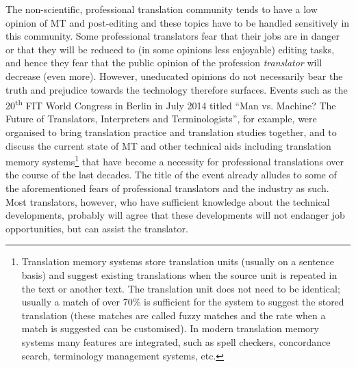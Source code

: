 \documentclass[output=paper]{langsci/langscibook}
\begin{document}
The non-scientific, professional translation community tends to have a low opinion of MT and post-editing and these topics have to be handled sensitively in this community. Some professional translators fear that their jobs are in danger or that they will be reduced to (in some opinions less enjoyable) editing tasks, and hence they fear that the public opinion of the profession \textit{translator} will decrease (even more). However, uneducated opinions do not necessarily bear the truth and prejudice towards the technology therefore surfaces. Events such as the 20\textsuperscript{th} FIT World Congress in Berlin in July 2014 titled ``Man vs. Machine? The Future of Translators, Interpreters and Terminologists'', for example, were organised to bring translation practice and translation studies together, and to discuss the current state of MT and other technical aids including translation memory systems\footnote{Translation memory systems store translation units (usually on a sentence basis) and suggest existing translations when the source unit is repeated in the text or another text. The translation unit does not need to be identical; usually a match of over 70\% is sufficient for the system to suggest the stored translation (these matches are called fuzzy matches and the rate when a match is suggested can be customised). In modern translation memory systems many features are integrated, such as spell checkers, concordance search, terminology management systems, etc.} that have become a necessity for professional translations over the course of the last decades. The title of the event already alludes to some of the aforementioned fears of professional translators and the industry as such. Most translators, however, who have sufficient knowledge about the technical developments, probably will agree that these developments will not endanger job opportunities, but can assist the translator.
\end{document}
